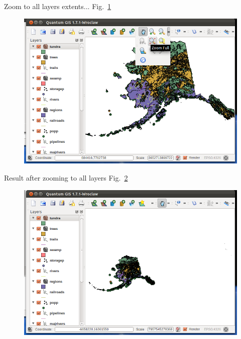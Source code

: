 Zoom to all layers extents... Fig.~\ref{fig:qgis004}

\begin{figure}[htbp]
   \centering
   \includegraphics[scale=0.35]{qgis004.png}
   \caption{}
   \label{fig:qgis004}
\end{figure}

Result after zooming to all layers Fig.~\ref{fig:qgis005}

\begin{figure}[htbp]
   \centering
   \includegraphics[scale=0.35]{qgis005.png}
   \caption{}
   \label{fig:qgis005}
\end{figure}

